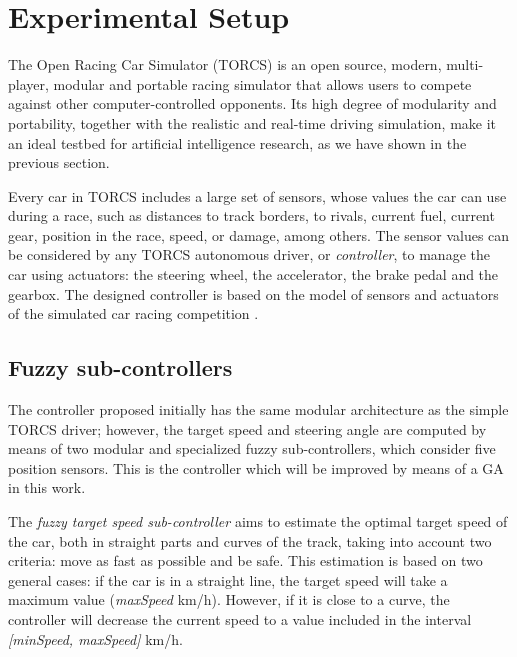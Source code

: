 \documentclass[conference]{IEEEtran}
\begin{document}

\section{Experimental Setup}
\label{sec:experimental_setup}

The Open Racing Car Simulator (TORCS) \cite{WebTORCS} is an open
source, modern, multi-player, modular and portable racing simulator
that allows users to compete against other computer-controlled opponents.
Its high degree of modularity and portability, together with the
realistic and real-time driving simulation, make it an ideal testbed
for artificial intelligence research, as we have shown in the previous section.

Every car in TORCS includes a large set of sensors, whose values the car can use during a race, such as distances to track borders, to rivals, current fuel, current gear, position in the race, speed, or damage, among others. The sensor values can be considered by any TORCS autonomous driver, or {\em controller}, to manage the car using actuators: the steering wheel, the accelerator, the brake pedal and the gearbox.  
The designed controller is based on the model of sensors and actuators of the simulated car racing competition \cite{CarRacingCompetition_SoftwareManual13}.



\subsection{Fuzzy sub-controllers}
\label{subsec:subcontrollers}

The controller proposed initially \cite{evo17} has the same modular
architecture as the simple TORCS driver; however, the target speed and
steering angle are computed by means of two modular and specialized
fuzzy sub-controllers, which consider five position sensors. This is
the controller which will be improved by means of a GA in this
work.

The {\em fuzzy target speed sub-controller} aims to estimate the
optimal target speed of the car, both in straight parts and curves of
the track, taking into account two criteria: move as fast as possible
and be safe. This estimation is based on two general cases: if the car
is in a straight line, the target speed will take a maximum value
(\textit{maxSpeed} km/h). However, if it is close to a curve, the
controller will decrease the current speed to a value included in the
interval \textit{[minSpeed, maxSpeed]} km/h. 
\end{document}
